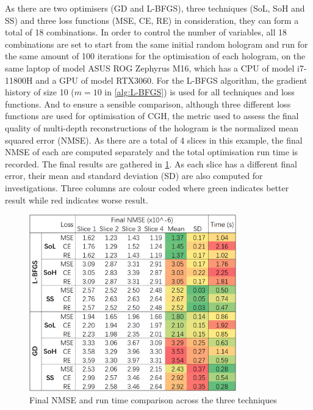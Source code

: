 As there are two optimisers (GD and L-BFGS), three techniques (SoL, SoH and SS) and three loss functions (MSE, CE, RE) in consideration, they can form a total of 18 combinations. In order to control the number of variables, all 18 combinations are set to start from the same initial random hologram and run for the same amount of 100 iterations for the optimisation of each hologram, on the same laptop of model ASUS ROG Zephyrus M16, which has a CPU of model i7-11800H and a GPU of model RTX3060. For the L-BFGS algorithm, the gradient history of size 10 ($m=10$ in \cref{alg:L-BFGS}) is used for all techniques and loss functions. And to ensure a sensible comparison, although three different loss functions are used for optimisation of CGH, the metric used to assess the final quality of multi-depth reconstructions of the hologram is the normalized mean squared error (NMSE). As there are a total of 4 slices in this example, the final NMSE of each are computed separately and the total optimisation run time is recorded. The final results are gathered in \cref{fig:Technique_Loss_comparison}. As each slice has a different final error, their mean and standard deviation (SD) are also computed for investigations. Three columns are colour coded where green indicates better result while red indicates worse result.

\begin{figure}[H]
	\centering
	\includegraphics[width=0.8\textwidth]{Technique_Loss_comparison}
	\caption{Final NMSE and run time comparison across the three techniques}
	\label{fig:Technique_Loss_comparison}
\end{figure}

